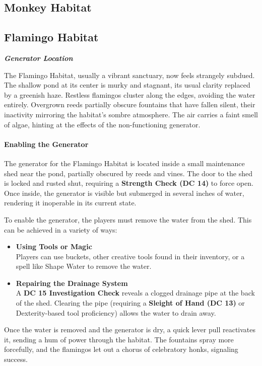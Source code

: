 \subsection*{ Monkey Habitat}

\subsection*{ Flamingo Habitat}
\textbf{\textit{Generator Location}}
\begin{DndReadAloud}
	The Flamingo Habitat, usually a vibrant sanctuary, now feels strangely subdued. The shallow pond at its center is murky and stagnant, its usual clarity replaced by a greenish haze. Restless flamingos cluster along the edges, avoiding the water entirely. Overgrown reeds partially obscure fountains that have fallen silent, their inactivity mirroring the habitat's sombre atmosphere. The air carries a faint smell of algae, hinting at the effects of the non-functioning generator.
\end{DndReadAloud}

\paragraph*{Enabling the Generator}
{\entryfont The generator for the Flamingo Habitat is located inside a small maintenance shed near the pond, partially obscured by reeds and vines. The door to the shed is locked and rusted shut, requiring a \textbf{Strength Check (DC 14)} to force open. Once inside, the generator is visible but submerged in several inches of water, rendering it inoperable in its current state.

To enable the generator, the players must remove the water from the shed. This can be achieved in a variety of ways:

\begin{itemize}
	\renewcommand\labelitemi{\textbf{\textbullet}}%
	\item \textbf{Using Tools or Magic}\\
	Players can use buckets, other creative tools found in their inventory, or a spell like Shape Water to remove the water.
	\item \textbf{Repairing the Drainage System}\\
	A \textbf{DC 15 Investigation Check} reveals a clogged drainage pipe at the back of the shed. Clearing the pipe (requiring a \textbf{Sleight of Hand (DC 13)} or Dexterity-based tool proficiency) allows the water to drain away.
\end{itemize}
Once the water is removed and the generator is dry, a quick lever pull reactivates it, sending a hum of power through the habitat. The fountains spray more forcefully, and the flamingos let out a chorus of celebratory honks, signaling success.}

